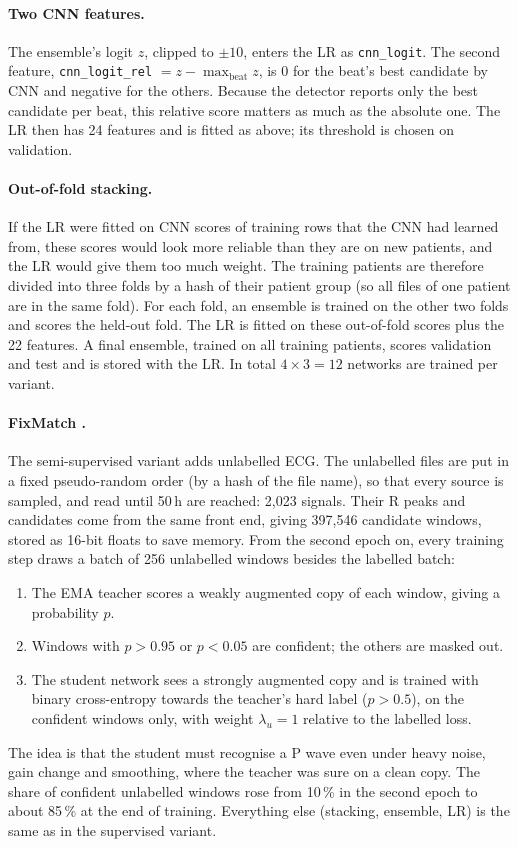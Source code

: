 \documentclass[11pt,a4paper]{article}
\newcommand{\code}[1]{\texttt{#1}}
\begin{document}
\paragraph{Two CNN features.} The ensemble's logit $z$, clipped to $\pm10$, enters the LR as \code{cnn\_logit}. The second feature, \code{cnn\_logit\_rel} $= z - \max_{\text{beat}} z$, is 0 for the beat's best candidate by CNN and negative for the others. Because the detector reports only the best candidate per beat, this relative score matters as much as the absolute one. The LR then has 24 features and is fitted as above; its threshold is chosen on validation.

\paragraph{Out-of-fold stacking.} If the LR were fitted on CNN scores of training rows that the CNN had learned from, these scores would look more reliable than they are on new patients, and the LR would give them too much weight. The training patients are therefore divided into three folds by a hash of their patient group (so all files of one patient are in the same fold). For each fold, an ensemble is trained on the other two folds and scores the held-out fold. The LR is fitted on these out-of-fold scores plus the 22 features. A final ensemble, trained on all training patients, scores validation and test and is stored with the LR. In total $4 \times 3 = 12$ networks are trained per variant.

\paragraph{FixMatch \cite{fixmatch}.} The semi-supervised variant adds unlabelled ECG. The unlabelled files are put in a fixed pseudo-random order (by a hash of the file name), so that every source is sampled, and read until 50\,h are reached: 2,023 signals. Their R peaks and candidates come from the same front end, giving 397,546 candidate windows, stored as 16-bit floats to save memory. From the second epoch on, every training step draws a batch of 256 unlabelled windows besides the labelled batch:
\begin{enumerate}
\item The EMA teacher scores a weakly augmented copy of each window, giving a probability $p$.
\item Windows with $p > 0.95$ or $p < 0.05$ are confident; the others are masked out.
\item The student network sees a strongly augmented copy and is trained with binary cross-entropy towards the teacher's hard label ($p > 0.5$), on the confident windows only, with weight $\lambda_u = 1$ relative to the labelled loss.
\end{enumerate}
The idea is that the student must recognise a P wave even under heavy noise, gain change and smoothing, where the teacher was sure on a clean copy. The share of confident unlabelled windows rose from 10\,\% in the second epoch to about 85\,\% at the end of training. Everything else (stacking, ensemble, LR) is the same as in the supervised variant.
\end{document}
